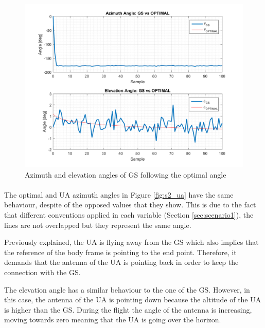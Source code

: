 \begin{figure}[H]
	\centering
	\includegraphics[scale=0.75]{figures/s2_gs.png}
	\caption{Azimuth and elevation angles of GS following the optimal angle}
	\label{fig:s2_gs}
\end{figure}


\paragraph{}
The optimal and UA azimuth angles in Figure \ref{fig:s2_ua} have the same behaviour, despite of the opposed values that they show. This is due to the fact that different conventions applied in each variable (Section \ref{sec:scenario1}), the lines are not overlapped but they represent the same angle.

Previously explained, the UA is flying away from the GS which also implies that the reference of the body frame is pointing to the end point. Therefore, it demands that the antenna of the UA is pointing back in order to keep the connection with the GS. 

The elevation angle has a similar behaviour to the one of the GS. However, in this case, the antenna of the UA is pointing down because the altitude of the UA is higher than the GS. During the flight the angle of the antenna is increasing, moving towards zero meaning that the UA is going over the horizon.


